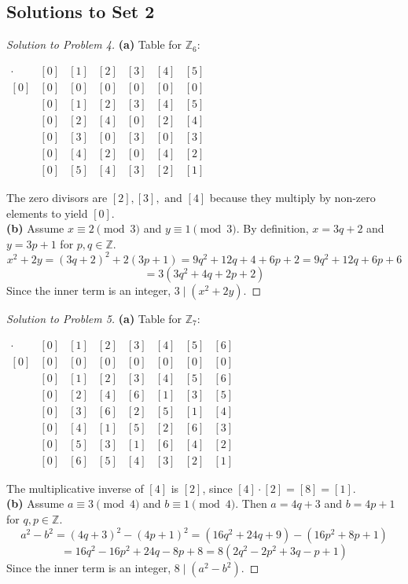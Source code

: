 \documentclass{article}
\begin{document}
\subsection{Solutions to Set 2}
\begin{proof}[Solution to Problem 4]
\textbf{(a)} Table for $\mathbb{Z}_6$:
\begin{center}
$
\begin{array}{c|cccccc}
\cdot & [0] & [1] & [2] & [3] & [4] & [5] \\
\hline
[0] & [0] & [0] & [0] & [0] & [0] & [0] \\
[1] & [0] & [1] & [2] & [3] & [4] & [5] \\
[2] & [0] & [2] & [4] & [0] & [2] & [4] \\
[3] & [0] & [3] & [0] & [3] & [0] & [3] \\
[4] & [0] & [4] & [2] & [0] & [4] & [2] \\
[5] & [0] & [5] & [4] & [3] & [2] & [1]
\end{array}
$
\end{center}
The zero divisors are $[2], [3], \text{ and } [4]$ because they multiply by non-zero elements to yield $[0]$. \\
\textbf{(b)} Assume $x \equiv 2 \pmod 3$ and $y \equiv 1 \pmod 3$. By definition, $x = 3q + 2$ and $y = 3p + 1$ for $p, q \in \mathbb{Z}$.
\[ x^2 + 2y = (3q+2)^2 + 2(3p+1) = 9q^2 + 12q + 4 + 6p + 2 = 9q^2 + 12q + 6p + 6 \]
\[ = 3(3q^2 + 4q + 2p + 2) \]
Since the inner term is an integer, $3 \mid (x^2+2y)$.
\end{proof}

\begin{proof}[Solution to Problem 5]
\textbf{(a)} Table for $\mathbb{Z}_7$:
\begin{center}
$
\begin{array}{c|ccccccc}
\cdot & [0] & [1] & [2] & [3] & [4] & [5] & [6] \\
\hline
[0] & [0] & [0] & [0] & [0] & [0] & [0] & [0] \\
[1] & [0] & [1] & [2] & [3] & [4] & [5] & [6] \\
[2] & [0] & [2] & [4] & [6] & [1] & [3] & [5] \\
[3] & [0] & [3] & [6] & [2] & [5] & [1] & [4] \\
[4] & [0] & [4] & [1] & [5] & [2] & [6] & [3] \\
[5] & [0] & [5] & [3] & [1] & [6] & [4] & [2] \\
[6] & [0] & [6] & [5] & [4] & [3] & [2] & [1]
\end{array}
$
\end{center}
The multiplicative inverse of $[4]$ is $[2]$, since $[4] \cdot [2] = [8] = [1]$. \\
\textbf{(b)} Assume $a \equiv 3 \pmod 4$ and $b \equiv 1 \pmod 4$. Then $a = 4q+3$ and $b = 4p+1$ for $q, p \in \mathbb{Z}$.
\[ a^2 - b^2 = (4q+3)^2 - (4p+1)^2 = (16q^2 + 24q + 9) - (16p^2 + 8p + 1) \]
\[ = 16q^2 - 16p^2 + 24q - 8p + 8 = 8(2q^2 - 2p^2 + 3q - p + 1) \]
Since the inner term is an integer, $8 \mid (a^2-b^2)$.
\end{proof}
\end{document}
